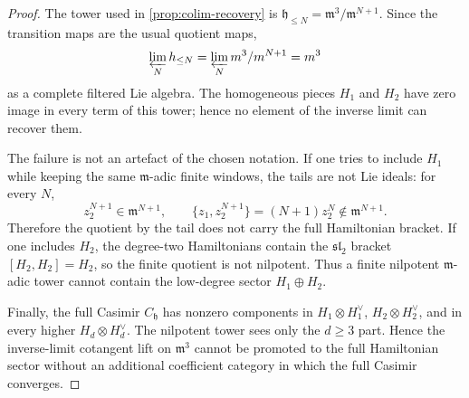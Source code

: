 \begin{proof}
  The tower used in \ref{prop:colim-recovery} is
  \(\mathfrak h_{\leq N}=\mathfrak m^3/\mathfrak m^{N+1}\).
  Since the transition maps are the usual quotient maps,
  \[
    \varprojlim_N \mathfrak h_{\leq N}
      =\varprojlim_N \mathfrak m^3/\mathfrak m^{N+1}
      =\mathfrak m^3
  \]
  as a complete filtered Lie algebra.  The homogeneous pieces
  \(H_1\) and \(H_2\) have zero image in every term of this tower;
  hence no element of the inverse limit can recover them.

  The failure is not an artefact of the chosen notation.  If one tries
  to include \(H_1\) while keeping the same \(\mathfrak m\)-adic
  finite windows, the tails are not Lie ideals: for every \(N\),
  \[
    z_2^{N+1}\in\mathfrak m^{N+1},\qquad
    \{z_1,z_2^{N+1}\}=(N+1)z_2^N\notin\mathfrak m^{N+1}.
  \]
  Therefore the quotient by the tail does not carry the full
  Hamiltonian bracket.  If one includes \(H_2\), the degree-two
  Hamiltonians contain the \(\mathfrak{sl}_2\) bracket
  \([H_2,H_2]=H_2\), so the finite quotient is not nilpotent.  Thus a
  finite nilpotent \(\mathfrak m\)-adic tower cannot contain the
  low-degree sector \(H_1\oplus H_2\).

  Finally, the full Casimir \(C_{\mathfrak h}\) has nonzero components
  in \(H_1\otimes H_1^\vee\), \(H_2\otimes H_2^\vee\), and in every
  higher \(H_d\otimes H_d^\vee\).  The nilpotent tower sees only the
  \(d\geq3\) part.  Hence the inverse-limit cotangent lift on
  \(\mathfrak m^3\) cannot be promoted to the full Hamiltonian sector
  without an additional coefficient category in which the full Casimir
  converges.
\end{proof}

